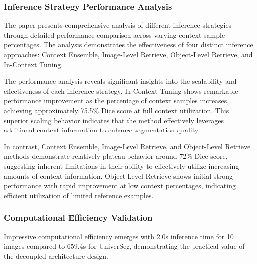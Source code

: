 \subsubsection{Inference Strategy Performance Analysis}
The paper presents comprehensive analysis of different inference strategies through detailed performance comparison across varying context sample percentages. The analysis demonstrates the effectiveness of four distinct inference approaches: Context Ensemble, Image-Level Retrieve, Object-Level Retrieve, and In-Context Tuning.


The performance analysis reveals significant insights into the scalability and effectiveness of each inference strategy. In-Context Tuning shows remarkable performance improvement as the percentage of context samples increases, achieving approximately 75.5\% Dice score at full context utilization. This superior scaling behavior indicates that the method effectively leverages additional context information to enhance segmentation quality.

In contrast, Context Ensemble, Image-Level Retrieve, and Object-Level Retrieve methods demonstrate relatively plateau behavior around 72\% Dice score, suggesting inherent limitations in their ability to effectively utilize increasing amounts of context information. Object-Level Retrieve shows initial strong performance with rapid improvement at low context percentages, indicating efficient utilization of limited reference examples.

\subsubsection{Computational Efficiency Validation}
Impressive computational efficiency emerges with 2.0s inference time for 10 images compared to 659.4s for UniverSeg, demonstrating the practical value of the decoupled architecture design.

